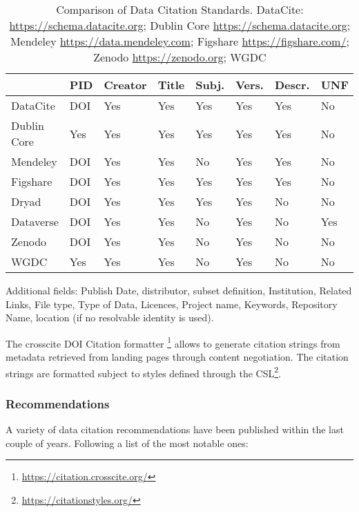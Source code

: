 \documentclass[a4paper,10pt]{article}
\begin{document}
\begin{table}
    \caption{Comparison of Data Citation Standards. DataCite: \url{https://schema.datacite.org}; Dublin Core \url{https://schema.datacite.org}; Mendeley \url{https://data.mendeley.com}; Figshare \url{https://figshare.com/}; Zenodo \url{https://zenodo.org}; WGDC \citep{Rauber2015}} 
    \begin{tabularx}{\columnwidth}{lll lll ll}
        \toprule
                                & PID   & Creator & Title & Subj.   & Vers.   & Descr.    & UNF \\ \midrule
        DataCite                & DOI   & Yes     & Yes   & Yes     & Yes     & Yes       & No  \\
        Dublin Core             & Yes   & Yes     & Yes   & Yes     & Yes     & Yes       & No  \\ 
        Mendeley                & DOI   & Yes     & Yes   & No      & Yes     & Yes       & No  \\
        Figshare                & DOI   & Yes     & Yes   & Yes     & Yes     & Yes       & No  \\
        Dryad                   & DOI   & Yes     & Yes   & Yes     & Yes     & No        & No  \\
        Dataverse               & DOI   & Yes     & Yes   & No      & Yes     & No        & Yes \\
        Zenodo                  & DOI   & Yes     & Yes   & No      & Yes     & No        & No  \\
        WGDC                    & Yes   & Yes     & Yes   & No      & Yes     & No        & No  \\
        \bottomrule
    \end{tabularx}
\end{table}


Additional fields: 
Publish Date, distributor, subset definition, Institution, Related Links, File type, Type of Data, Licences, Project name, Keywords, Repository Name, location (if no resolvable identity is used).

The crosscite DOI Citation formatter \footnote{\url{https://citation.crosscite.org/}} allows to generate citation strings from metadata retrieved from landing pages through content negotiation.
The citation strings are formatted subject to styles defined through the \gls{CSL}\footnote{\url{https://citationstyles.org/}}.



\subsubsection{Recommendations}
A variety of data citation recommendations have been published within the last couple of years.
Following a list of the most notable ones:
\end{document}
